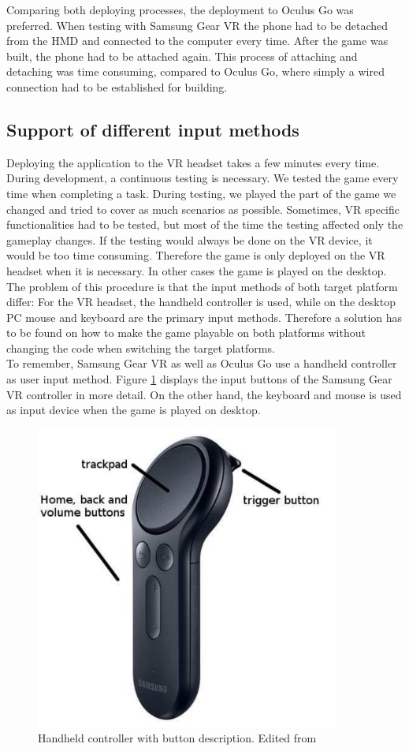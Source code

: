 Comparing both deploying processes, the deployment to Oculus Go was preferred. When testing with Samsung Gear VR the phone had to be detached from the HMD and connected to the computer every time. After the game was built, the phone had to be attached again. This process of attaching and detaching was time consuming, compared to Oculus Go, where simply a wired connection had to be established for building.
\subsection{Support of different input methods}
Deploying the application to the VR headset takes a few minutes every time. During development, a continuous testing is necessary. We tested the game every time when completing a task. During testing, we played the part of the game we changed and tried to cover as much scenarios as possible. Sometimes, VR specific functionalities had to be tested, but most of the time the testing affected only the gameplay changes. If the testing would always be done on the VR device, it would be too time consuming. Therefore the game is only deployed on the VR headset when it is necessary. In other cases the game is played on the desktop. \\
The problem of this procedure is that the input methods of both target platform differ: For the VR headset, the handheld controller is used, while on the desktop PC mouse and keyboard are the primary input methods. Therefore a solution has to be found on how to make the game playable on both platforms without changing the code when switching the target platforms.\\ 
To remember, Samsung Gear VR as well as Oculus Go use a handheld controller as user input method. Figure \ref{fig:controller} displays the input buttons of the Samsung Gear VR controller in more detail. On the other hand, the keyboard and mouse is used as input device when the game is played on desktop.\\
\begin{figure}[h!]
  \includegraphics[width=10cm]{kapitel/eps/samsung-controller.pdf}
  \centering
  \caption{Handheld controller with button description. Edited from \cite{Samsung.2019b}}
  \label{fig:controller}
\end{figure}

